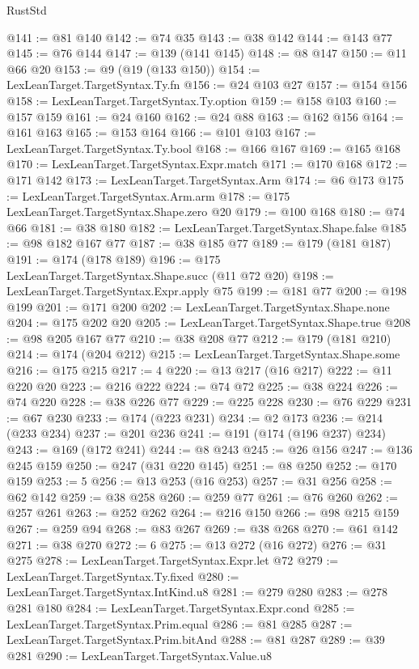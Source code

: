 \begin{lexlean}{RustStd}
\begin{coremodule}
{\begin{coremodule}
{{{{{{{{{{{{{{@141 := @81 @140
@142 := @74 @35
@143 := @38 @142
@144 := @143 @77
@145 := @76 @144
@147 := @139 (@141 @145)
@148 := @8 @147
@150 := @11 @66 @20
@153 := @9 (@19 (@133 @150))
@154 := LexLeanTarget.TargetSyntax.Ty.fn
@156 := @24 @103 @27
@157 := @154 @156
@158 := LexLeanTarget.TargetSyntax.Ty.option
@159 := @158 @103
@160 := @157 @159
@161 := @24 @160
@162 := @24 @88
@163 := @162 @156
@164 := @161 @163
@165 := @153 @164
@166 := @101 @103
@167 := LexLeanTarget.TargetSyntax.Ty.bool
@168 := @166 @167
@169 := @165 @168
@170 := LexLeanTarget.TargetSyntax.Expr.match
@171 := @170 @168
@172 := @171 @142
@173 := LexLeanTarget.TargetSyntax.Arm
@174 := @6 @173
@175 := LexLeanTarget.TargetSyntax.Arm.arm
@178 := @175 LexLeanTarget.TargetSyntax.Shape.zero @20
@179 := @100 @168
@180 := @74 @66
@181 := @38 @180
@182 := LexLeanTarget.TargetSyntax.Shape.false
@185 := @98 @182 @167 @77
@187 := @38 @185 @77
@189 := @179 (@181 @187)
@191 := @174 (@178 @189)
@196 := @175 LexLeanTarget.TargetSyntax.Shape.succ (@11 @72 @20)
@198 := LexLeanTarget.TargetSyntax.Expr.apply @75
@199 := @181 @77
@200 := @198 @199
@201 := @171 @200
@202 := LexLeanTarget.TargetSyntax.Shape.none
@204 := @175 @202 @20
@205 := LexLeanTarget.TargetSyntax.Shape.true
@208 := @98 @205 @167 @77
@210 := @38 @208 @77
@212 := @179 (@181 @210)
@214 := @174 (@204 @212)
@215 := LexLeanTarget.TargetSyntax.Shape.some
@216 := @175 @215
@217 := 4
@220 := @13 @217 (@16 @217)
@222 := @11 @220 @20
@223 := @216 @222
@224 := @74 @72
@225 := @38 @224
@226 := @74 @220
@228 := @38 @226 @77
@229 := @225 @228
@230 := @76 @229
@231 := @67 @230
@233 := @174 (@223 @231)
@234 := @2 @173
@236 := @214 (@233 @234)
@237 := @201 @236
@241 := @191 (@174 (@196 @237) @234)
@243 := @169 (@172 @241)
@244 := @8 @243
@245 := @26 @156
@247 := @136 @245 @159
@250 := @247 (@31 @220 @145)
@251 := @8 @250
@252 := @170 @159
@253 := 5
@256 := @13 @253 (@16 @253)
@257 := @31 @256
@258 := @62 @142
@259 := @38 @258
@260 := @259 @77
@261 := @76 @260
@262 := @257 @261
@263 := @252 @262
@264 := @216 @150
@266 := @98 @215 @159
@267 := @259 @94
@268 := @83 @267
@269 := @38 @268
@270 := @61 @142
@271 := @38 @270
@272 := 6
@275 := @13 @272 (@16 @272)
@276 := @31 @275
@278 := LexLeanTarget.TargetSyntax.Expr.let @72
@279 := LexLeanTarget.TargetSyntax.Ty.fixed
@280 := LexLeanTarget.TargetSyntax.IntKind.u8
@281 := @279 @280
@283 := @278 @281 @180
@284 := LexLeanTarget.TargetSyntax.Expr.cond
@285 := LexLeanTarget.TargetSyntax.Prim.equal
@286 := @81 @285
@287 := LexLeanTarget.TargetSyntax.Prim.bitAnd
@288 := @81 @287
@289 := @39 @281
@290 := LexLeanTarget.TargetSyntax.Value.u8
}}}}}}}}}}}}}}
\end{coremodule}}
\end{coremodule}
\end{lexlean}
